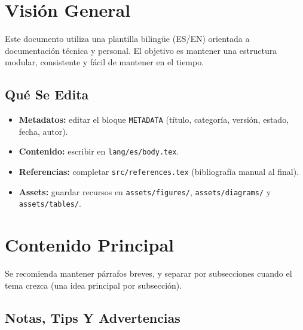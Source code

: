 
\section{Visión General}
\vspace{2mm}

Este documento utiliza una plantilla bilingüe (ES/EN) orientada a documentación técnica y personal. El objetivo es mantener una estructura modular, consistente y fácil de mantener en el tiempo.

\vspace{2mm}


\subsection{Qué Se Edita}
\vspace{2mm}

\begin{itemize}
  \item \textbf{Metadatos:} editar el bloque \texttt{METADATA} (título, categoría, versión, estado, fecha, autor).
  \item \textbf{Contenido:} escribir en \texttt{lang/es/body.tex}.
  \item \textbf{Referencias:} completar \texttt{src/references.tex} (bibliografía manual al final).
  \item \textbf{Assets:} guardar recursos en \texttt{assets/figures/}, \texttt{assets/diagrams/} y \texttt{assets/tables/}.
\end{itemize}

\vspace{2mm}


\section{Contenido Principal}
\vspace{2mm}

Se recomienda mantener párrafos breves, y separar por subsecciones cuando el tema crezca (una idea principal por subsección).

\vspace{2mm}


\subsection{Notas, Tips Y Advertencias}
\vspace{2mm}

